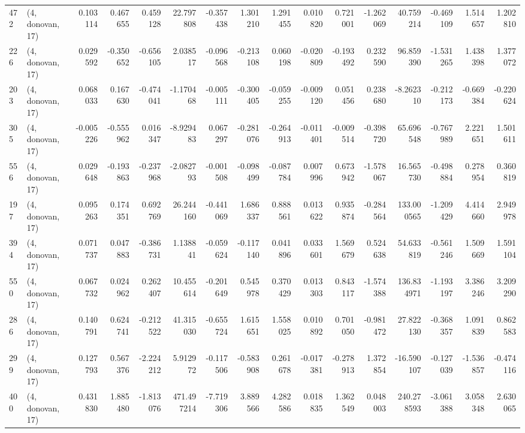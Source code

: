 \begin{tabular}{llrrrrrrrrrrrrrr}
472 &  (4, donovan, 17) &   0.103114 &  0.467655 &  0.459128 &   22.797808 & -0.357438 &   1.301210 &   1.291455 &  0.010820 &  0.721001 & -1.262069 &   40.759214 & -0.469109 &   1.514657 &   1.202810 \\
226 &  (4, donovan, 17) &   0.029592 & -0.350652 & -0.656105 &    2.038517 & -0.096568 &  -0.213108 &   0.060198 & -0.020809 & -0.193492 &  0.232590 &   96.859390 & -1.531265 &   1.438398 &   1.377072 \\
203 &  (4, donovan, 17) &   0.068033 &  0.167630 & -0.474041 &   -1.170468 & -0.005111 &  -0.300405 &  -0.059255 & -0.009120 &  0.051456 &  0.238680 &   -8.262310 & -0.212173 &  -0.669384 &  -0.220624 \\
305 &  (4, donovan, 17) &  -0.005226 & -0.555962 &  0.016347 &   -8.929483 &  0.067297 &  -0.281076 &  -0.264913 & -0.011401 & -0.009514 & -0.398720 &   65.696548 & -0.767989 &   2.221651 &   1.501611 \\
556 &  (4, donovan, 17) &   0.029648 & -0.193863 & -0.237968 &   -2.082793 & -0.001508 &  -0.098499 &  -0.087784 &  0.007996 &  0.673942 & -1.578067 &   16.565730 & -0.498884 &   0.278954 &   0.360819 \\
197 &  (4, donovan, 17) &   0.095263 &  0.174351 &  0.692769 &   26.244160 & -0.441069 &   1.686337 &   0.888561 &  0.013622 &  0.935874 & -0.284564 &  133.000565 & -1.209429 &   4.414660 &   2.949978 \\
394 &  (4, donovan, 17) &   0.071737 &  0.047883 & -0.386731 &    1.138841 & -0.059624 &  -0.117140 &   0.041896 &  0.033601 &  1.569679 &  0.524638 &   54.633819 & -0.561246 &   1.509669 &   1.591104 \\
550 &  (4, donovan, 17) &   0.067732 &  0.024962 &  0.262407 &   10.455614 & -0.201649 &   0.545978 &   0.370429 &  0.013303 &  0.843117 & -1.574388 &  136.834971 & -1.193197 &   3.386246 &   3.209290 \\
286 &  (4, donovan, 17) &   0.140791 &  0.624741 & -0.212522 &   41.315030 & -0.655724 &   1.615651 &   1.558025 &  0.010892 &  0.701050 & -0.981472 &   27.822130 & -0.368357 &   1.091839 &   0.862583 \\
299 &  (4, donovan, 17) &   0.127793 &  0.567376 & -2.224212 &    5.912972 & -0.117506 &  -0.583908 &   0.261678 & -0.017381 & -0.278913 &  1.372854 &  -16.590107 & -0.127039 &  -1.536857 &  -0.474116 \\
400 &  (4, donovan, 17) &   0.431830 &  1.885480 & -1.813076 &  471.497214 & -7.719306 &   3.889566 &   4.282586 &  0.018835 &  1.362549 &  0.048003 &  240.278593 & -3.061388 &   3.058348 &   2.630065 \\

\end{tabular}
